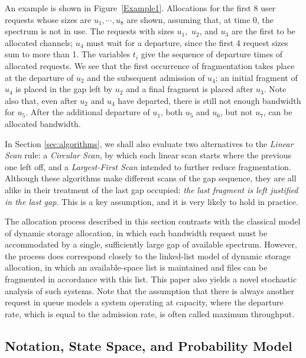 \documentclass{amsart}
\begin{document}
An example is  shown in Figure~\ref{Example1}.  Allocations for the  first 8 user requests whose sizes are
$u_1,  \cdots ,u_8$ are  shown, assuming  that, at  time 0,  the spectrum  is not  in use.
The requests with sizes $u_1,$ $u_2$, and  $u_3$ are the first to be allocated  channels; $u_4$ must wait
for a departure, since  the first 4 request sizes sum to more than  1.  The variables $t_i$ give the
sequence of  departure times of  allocated requests. We  see that the first  occurrence of
fragmentation takes place at  the departure of $u_2$ and the subsequent  admission of $u_4$; an
initial fragment  of $u_4$  is placed in  the gap left  by $u_2$  and a final  fragment is
placed after $u_3$.   Note also that, even  after $u_2$ and $u_4$ have  departed, there is
still not enough  bandwidth for $u_5$. After the additional departure  of $u_1$, both $u_5$
and $u_6$, but not $u_7$, can be allocated bandwidth.



In  Section \ref{sec:algorithms}, we  shall also evaluate two  alternatives to the \emph{Linear Scan} rule: a \emph{Circular Scan}, by which  each linear scan starts  where the
previous  one   left  off,  and  a  \emph{Largest-First Scan}
intended  to further reduce fragmentation.  Although these algorithms make different scans of the gap sequence,  they are all alike in their treatment of the last gap occupied: {\em  the last fragment is left justified in the last gap.}  This is a key assumption, and it is very likely to hold in practice. 

The allocation process described in this section contrasts with  the classical model of dynamic storage allocation,
in  which each bandwidth request must be accommodated by  a single,
sufficiently  large gap  of available  spectrum.   However, the  process does  correspond
closely  to   the  linked-list   model  of  dynamic   storage  allocation,  in   which  an
available-space list  is maintained and  files can be  fragmented in accordance  with this
list.  This paper also yields a novel  stochastic analysis of such systems.  Note that the
assumption that there is always another request in queue models a system operating at capacity, where the departure rate,
which is equal to the admission rate, is often called maximum throughput.

\subsection*{Notation, State Space, and Probability Model}
\end{document}
